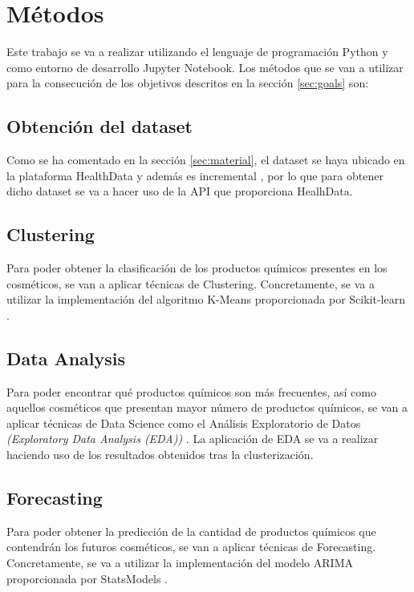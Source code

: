 \newpage
\section{Métodos}
\label{sec:methods}

Este trabajo se va a realizar utilizando el lenguaje de programación Python y como entorno de desarrollo Jupyter Notebook. Los métodos que se van a utilizar para la consecución de los objetivos descritos en la sección \ref{sec:goals} son:


\subsection{Obtención del dataset}

Como se ha comentado en la sección \ref{sec:material}, el dataset se haya ubicado en la plataforma HealthData y además es incremental \citep{dataset}, por lo que para obtener dicho dataset se va a hacer uso de la API \citep{healthdata-api} que proporciona HealhData. \\



\subsection{Clustering}

Para poder obtener la clasificación de los productos químicos presentes en los cosméticos, se van a aplicar técnicas de Clustering. Concretamente, se va a utilizar la implementación del algoritmo K-Means proporcionada por Scikit-learn \citep{scikit-learn}.



\subsection{Data Analysis}

Para poder encontrar qué productos químicos son más frecuentes, así como aquellos cosméticos que presentan mayor número de productos químicos, se van a aplicar técnicas de Data Science como el Análisis Exploratorio de Datos \textit{(Exploratory Data Analysis (EDA))} \citep{eda}. La aplicación de EDA se va a realizar haciendo uso de los resultados obtenidos tras la clusterización.


\subsection{Forecasting}

Para poder obtener la predicción de la cantidad de productos químicos que contendrán los futuros cosméticos, se van a aplicar técnicas de Forecasting. Concretamente, se va a utilizar la implementación del modelo ARIMA proporcionada por StatsModels \citep{arima}.





